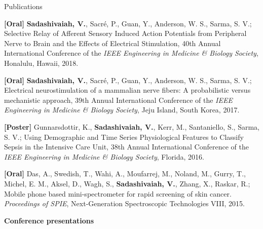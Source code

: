 \documentclass{resume}
\begin{document}
\begin{rSection}{Publications}
\begin{conferences}
\item \textbf{[Oral]} \textbf{Sadashivaiah, V.}, Sacré, P., Guan, Y., Anderson, W. S., Sarma, S. V.; Selective Relay of Afferent Sensory Induced Action Potentials from Peripheral Nerve to Brain and the Effects of Electrical Stimulation, 40th Annual International Conference of the \textit{IEEE Engineering in Medicine \& Biology Society}, Honalulu, Hawaii, 2018.

\item \textbf{[Oral]} \textbf{Sadashivaiah, V.}, Sacré, P., Guan, Y., Anderson, W. S., Sarma, S. V.; Electrical neurostimulation of a mammalian nerve fibers: A probabilistic versus mechanistic approach, 39th Annual International Conference of the \textit{IEEE Engineering in Medicine \& Biology Society}, Jeju Island, South Korea, 2017.

\item \textbf{[Poster]} Gunnarsdottir, K., \textbf{Sadashivaiah, V.}, Kerr, M., Santaniello, S., Sarma, S. V.; Using Demographic and Time Series Physiological Features to Classify Sepsis in the Intensive Care Unit, 38th Annual International Conference of the \textit{IEEE Engineering in Medicine \& Biology Society}, Florida, 2016.

\item \textbf{[Oral]} Das, A., Swedish, T., Wahi, A., Moufarrej, M., Noland, M., Gurry, T., Michel, E. M., Aksel, D., Wagh, S., \textbf{Sadashivaiah, V.}, Zhang, X., Raskar, R.; Mobile phone based mini-spectrometer for rapid screening of skin cancer. \textit{Proceedings of SPIE}, Next-Generation Spectroscopic Technologies VIII, 2015.

\end{conferences}
\end{rSection} 
\newpage
\textbf{\Large Conference presentations}
\end{document}
